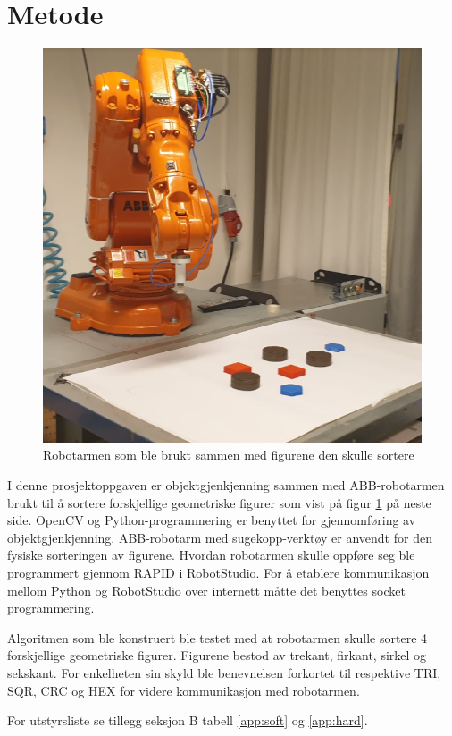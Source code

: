 \documentclass[conference]{IEEEtran}
\begin{document}
\section{Metode}
    \begin{figure}
        \centering
        \includegraphics[width=.8\linewidth]{images/robotarm.png}
        \caption{Robotarmen som ble brukt sammen med figurene den skulle sortere}
        \label{fig:metode}
    \end{figure}

    I denne prosjektoppgaven er objektgjenkjenning sammen med ABB-robotarmen brukt til å sortere forskjellige geometriske figurer som vist på figur \ref{fig:metode} på neste side. OpenCV og  Python-programmering er benyttet for gjennomføring av objektgjenkjenning. ABB-robotarm med sugekopp-verktøy er anvendt for den fysiske sorteringen av figurene. Hvordan robotarmen skulle oppføre seg ble programmert gjennom RAPID i RobotStudio. For å etablere kommunikasjon mellom Python og RobotStudio over internett måtte det benyttes socket programmering.

    Algoritmen som ble konstruert ble testet med at robotarmen skulle sortere 4 forskjellige geometriske figurer. Figurene bestod av trekant, firkant, sirkel og sekskant. For enkelheten sin skyld ble benevnelsen forkortet til respektive TRI, SQR, CRC og HEX for videre kommunikasjon 
    med robotarmen. 
    
    For utstyrsliste se tillegg seksjon B tabell \ref{app:soft} og \ref{app:hard}. 
    
\end{document}
